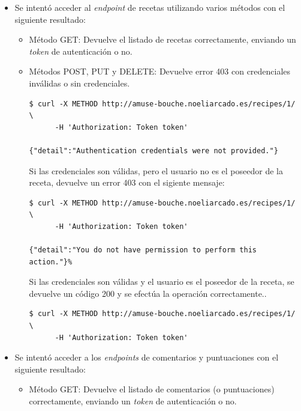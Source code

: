 \begin{itemize}
\item Se intentó acceder al \textit{endpoint} de recetas utilizando varios
  métodos con el siguiente resultado:

  \begin{itemize}
  \item Método GET: Devuelve el listado de recetas correctamente, enviando un
    \textit{token} de autenticación o no.

  \item Métodos POST, PUT y DELETE: Devuelve error 403 con credenciales inválidas o sin
    credenciales.

    \begin{verbatim}
$ curl -X METHOD http://amuse-bouche.noeliarcado.es/recipes/1/ \
      -H 'Authorization: Token token'

{"detail":"Authentication credentials were not provided."}            
    \end{verbatim}

    Si las credenciales son válidas, pero el usuario no es el poseedor de la
    receta, devuelve un error 403 con el sigiente mensaje:

    \begin{verbatim}
$ curl -X METHOD http://amuse-bouche.noeliarcado.es/recipes/1/ \
      -H 'Authorization: Token token'

{"detail":"You do not have permission to perform this action."}%               
    \end{verbatim}

    Si las credenciales son válidas y el usuario es el poseedor de la receta,
    se devuelve un código 200 y se efectúa la operación correctamente..

    \begin{verbatim}
$ curl -X METHOD http://amuse-bouche.noeliarcado.es/recipes/1/ \
      -H 'Authorization: Token token'    
    \end{verbatim}
    
  \end{itemize}

\item Se intentó acceder a los \textit{endpoints} de comentarios y puntuaciones
  con el siguiente resultado:

  \begin{itemize}
  \item Método GET: Devuelve el listado de comentarios (o puntuaciones)
    correctamente, enviando un \textit{token} de autenticación o no.


\end{itemize}
\end{itemize}
